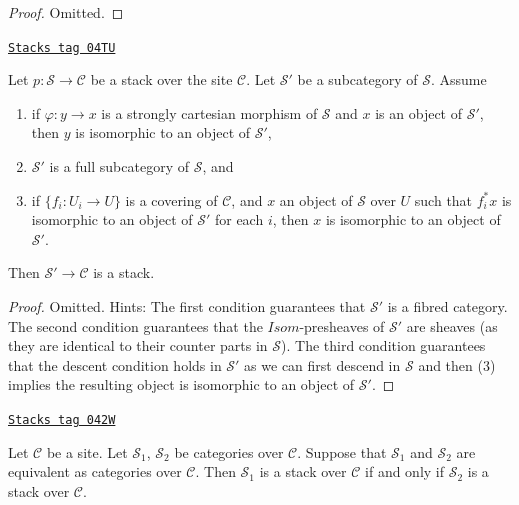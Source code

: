 \begin{proof}
Omitted.
\end{proof}

\begin{lemma}[Substack]
\label{stacks-lemma-substack}
\href{https://stacks.math.columbia.edu/tag/04TU}{\texttt{Stacks tag 04TU}}

Let $p : \mathcal{S} \to \mathcal{C}$ be a stack over the site $\mathcal{C}$.
Let $\mathcal{S}'$ be a subcategory of $\mathcal{S}$.
Assume
\begin{enumerate}
\item if $\varphi : y \to x$ is a strongly cartesian
morphism of $\mathcal{S}$ and
$x$ is an object of $\mathcal{S}'$, then $y$ is isomorphic to an
object of $\mathcal{S}'$,
\item $\mathcal{S}'$ is a full subcategory of $\mathcal{S}$, and
\item if $\{f_i : U_i \to U\}$ is a covering of $\mathcal{C}$,
and $x$ an object of $\mathcal{S}$ over $U$ such that $f_i^*x$
is isomorphic to an object of $\mathcal{S}'$ for each $i$,
then $x$ is isomorphic to an object of $\mathcal{S}'$.
\end{enumerate}
Then $\mathcal{S}' \to \mathcal{C}$ is a stack.
\end{lemma}

\begin{proof}
Omitted. Hints:
The first condition guarantees that $\mathcal{S}'$ is a fibred category.
The second condition guarantees that the $\mathit{Isom}$-presheaves
of $\mathcal{S}'$ are sheaves (as they are identical to their counter parts
in $\mathcal{S}$). The third condition guarantees that the descent condition
holds in $\mathcal{S}'$ as we can first descend in $\mathcal{S}$ and
then (3) implies the resulting object is isomorphic to an object of
$\mathcal{S}'$.
\end{proof}

\begin{lemma}
\label{stacks-lemma-stack-equivalent}
\href{https://stacks.math.columbia.edu/tag/042W}{\texttt{Stacks tag 042W}}

Let $\mathcal{C}$ be a site.
Let $\mathcal{S}_1$, $\mathcal{S}_2$ be categories over $\mathcal{C}$.
Suppose that $\mathcal{S}_1$ and $\mathcal{S}_2$ are equivalent
as categories over $\mathcal{C}$.
Then $\mathcal{S}_1$ is a stack over $\mathcal{C}$ if and only if
$\mathcal{S}_2$ is a stack over $\mathcal{C}$.
\end{lemma}

